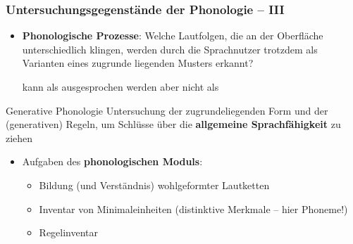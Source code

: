 \begin{frame}
\frametitle{Untersuchungsgegenstände der Phonologie -- III}
	
\begin{itemize}		
	\item \textbf{Phonologische Prozesse}: Welche Lautfolgen, die an der Oberfläche unterschiedlich klingen, werden durch die Sprachnutzer trotzdem als Varianten eines zugrunde liegenden Musters erkannt?

\ea \textipa{[ga{\textscr}t@n]} kann als \textipa{[ga:d\textsyllabic{n}]} ausgesprochen werden aber nicht als 
\textipa{[ga:b\s{m}]}
\z

\end{itemize}


\begin{block}{Generative Phonologie}
	Untersuchung der zugrundeliegenden Form und der (generativen) Regeln, um Schlüsse über die \textbf{allgemeine Sprachfähigkeit} zu ziehen
\end{block}

      
\begin{itemize}

\item Aufgaben des \textbf{phonologischen Moduls}:
	
	\begin{itemize}
		\item Bildung (und Verständnis) wohlgeformter Lautketten
		\item Inventar von Minimaleinheiten (distinktive Merkmale -- hier Phoneme!)
		\item Regelinventar
	\end{itemize}
	 
\end{itemize}

\end{frame}


